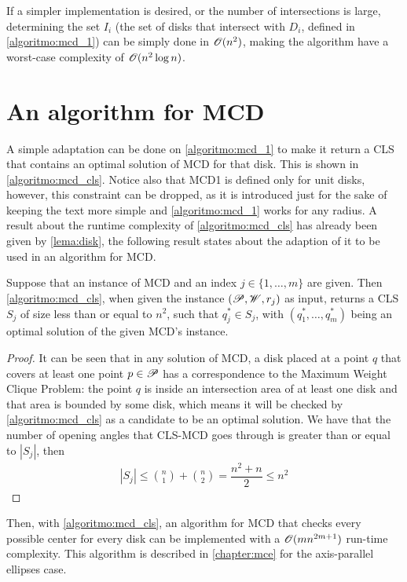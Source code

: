 If a simpler implementation is desired, or the number of intersections is large, determining the set $I_i$ (the set of disks that intersect with $D_i$, defined in \autoref{algoritmo:mcd_1}) can be simply done in $\mathscr{O}(n^2)$, making the algorithm have a worst-case complexity of $\mathscr{O}(n^2\log{n})$.


\section{An algorithm for MCD}

A simple adaptation can be done on \autoref{algoritmo:mcd_1} to make it return a CLS that contains an optimal solution of MCD for that disk. This is shown in \autoref{algoritmo:mcd_cls}. 
Notice also that MCD1 is defined only for unit disks, however, this constraint can be dropped, as it is introduced just for the sake of keeping the text more simple and \autoref{algoritmo:mcd_1} works for any radius. A result about the runtime complexity of \autoref{algoritmo:mcd_cls} has already been given by \autoref{lema:disk}, the following result states about the adaption of it to be used in an algorithm for MCD.

\begin{lema}\label{lema:mcd}
	Suppose that an instance of MCD and an index $j\in\{1, \dots, m\}$ are given.
	Then \autoref{algoritmo:mcd_cls}, when given the instance $(\mathscr{P}, \mathscr{W}, r_j)$ as input, returns a CLS $S_j$ of size less than or equal to $n^2$, such that $q^*_j\in S_j$, with $(q^*_1, \dots, q^*_m)$ being an optimal solution of the given MCD's instance.
\end{lema}

\begin{proof}
It can be seen that in any solution of MCD, a disk placed at a point $q$ that covers at least one point $p \in \mathscr{P}$ has a correspondence to the Maximum Weight Clique Problem: the point $q$ is inside an intersection area of at least one disk and that area is bounded by some disk, which means it will be checked by \autoref{algoritmo:mcd_cls} as a candidate to be an optimal solution.
We have that the number of opening angles that CLS-MCD goes through is greater than or equal to $|S_j|$, then
\begin{eqnarray*}
|S_j| \le \binom{n}{1} + \binom{n}{2} = \dfrac{n^2 + n}{2} \le n^2
\end{eqnarray*}
\end{proof}

Then, with \autoref{algoritmo:mcd_cls}, an algorithm for MCD that checks every possible center for every disk can be implemented with a $\mathscr{O}(mn^{2m+1})$ run-time complexity.
This algorithm is described in \autoref{chapter:mce} for the axis-parallel ellipses case.

